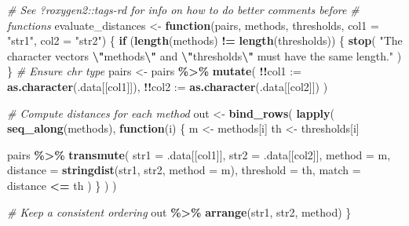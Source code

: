 \documentclass[
]{article}
\newenvironment{Shaded}{\begin{snugshade}}{\end{snugshade}}
\newcommand{\AttributeTok}[1]{\textcolor[rgb]{0.13,0.29,0.53}{#1}}
\newcommand{\CommentTok}[1]{\textcolor[rgb]{0.56,0.35,0.01}{\textit{#1}}}
\newcommand{\ControlFlowTok}[1]{\textcolor[rgb]{0.13,0.29,0.53}{\textbf{#1}}}
\newcommand{\FunctionTok}[1]{\textcolor[rgb]{0.13,0.29,0.53}{\textbf{#1}}}
\newcommand{\NormalTok}[1]{#1}
\newcommand{\OtherTok}[1]{\textcolor[rgb]{0.56,0.35,0.01}{#1}}
\newcommand{\SpecialCharTok}[1]{\textcolor[rgb]{0.81,0.36,0.00}{\textbf{#1}}}
\newcommand{\StringTok}[1]{\textcolor[rgb]{0.31,0.60,0.02}{#1}}
\begin{document}
\begin{Shaded}
\begin{Highlighting}[]
\CommentTok{\# See ?roxygen2::\textasciigrave{}tags{-}rd\textasciigrave{} for info on how to do better comments before}
\CommentTok{\# functions}
\NormalTok{evaluate\_distances }\OtherTok{\textless{}{-}} \ControlFlowTok{function}\NormalTok{(pairs, methods, thresholds, }\AttributeTok{col1 =} \StringTok{"str1"}\NormalTok{, }\AttributeTok{col2 =} \StringTok{"str2"}\NormalTok{) \{}
    \ControlFlowTok{if}\NormalTok{ (}\FunctionTok{length}\NormalTok{(methods) }\SpecialCharTok{!=}
        \FunctionTok{length}\NormalTok{(thresholds)) \{}
        \FunctionTok{stop}\NormalTok{(}
            \StringTok{"The character vectors }\SpecialCharTok{\textbackslash{}"}\StringTok{methods}\SpecialCharTok{\textbackslash{}"}\StringTok{ and }\SpecialCharTok{\textbackslash{}"}\StringTok{thresholds}\SpecialCharTok{\textbackslash{}"}\StringTok{ must have the same length."}
\NormalTok{        )}
\NormalTok{    \}}
    \CommentTok{\# Ensure chr type}
\NormalTok{    pairs }\OtherTok{\textless{}{-}}\NormalTok{ pairs }\SpecialCharTok{\%\textgreater{}\%}
        \FunctionTok{mutate}\NormalTok{(}
            \SpecialCharTok{!!}\AttributeTok{col1 :=} \FunctionTok{as.character}\NormalTok{(.data[[col1]]),}
            \SpecialCharTok{!!}\AttributeTok{col2 :=} \FunctionTok{as.character}\NormalTok{(.data[[col2]])}
\NormalTok{        )}

    \CommentTok{\# Compute distances for each method}
\NormalTok{    out }\OtherTok{\textless{}{-}} \FunctionTok{bind\_rows}\NormalTok{(}
        \FunctionTok{lapply}\NormalTok{(}
            \FunctionTok{seq\_along}\NormalTok{(methods),}
            \ControlFlowTok{function}\NormalTok{(i) \{}
\NormalTok{                m }\OtherTok{\textless{}{-}}\NormalTok{ methods[i]}
\NormalTok{                th }\OtherTok{\textless{}{-}}\NormalTok{ thresholds[i]}

\NormalTok{                pairs }\SpecialCharTok{\%\textgreater{}\%}
                  \FunctionTok{transmute}\NormalTok{(}
                    \AttributeTok{str1 =}\NormalTok{ .data[[col1]], }\AttributeTok{str2 =}\NormalTok{ .data[[col2]], }\AttributeTok{method =}\NormalTok{ m, }\AttributeTok{distance =} \FunctionTok{stringdist}\NormalTok{(str1, str2, }\AttributeTok{method =}\NormalTok{ m),}
                    \AttributeTok{threshold =}\NormalTok{ th, }\AttributeTok{match =}\NormalTok{ distance }\SpecialCharTok{\textless{}=}\NormalTok{ th}
\NormalTok{                )}
\NormalTok{            \}}
\NormalTok{        )}
\NormalTok{    )}

    \CommentTok{\# Keep a consistent ordering}
\NormalTok{    out }\SpecialCharTok{\%\textgreater{}\%}
        \FunctionTok{arrange}\NormalTok{(str1, str2, method)}
\NormalTok{\}}


\end{Highlighting}
\end{Shaded}
\end{document}
